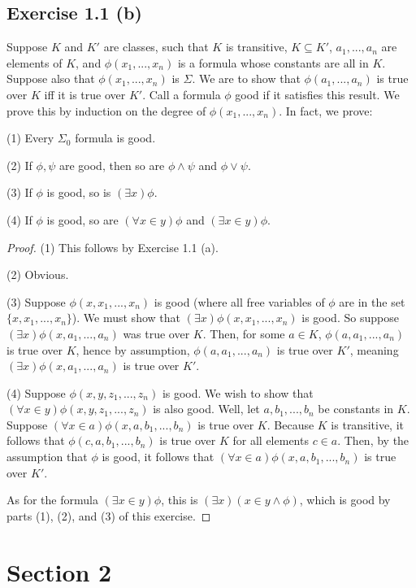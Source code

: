 \documentclass{article}
\theoremstyle{definition}
\begin{document}
\subsection*{Exercise 1.1 (b)} 
Suppose $K$ and $K'$ are classes, such that $K$ is transitive, $K\subseteq K'$, 
$a_1,...,a_n$ are elements of $K$, and $\phi(x_1,...,x_n)$ is a formula whose constants are all in
$K$. Suppose also that $\phi(x_1,...,x_n)$ is $\Sigma$. We are to show that $\phi(a_1,...,a_n)$ is 
true over $K$ iff it is true over $K'$. Call a formula $\phi$ good if it satisfies this result. 
We prove this by induction on the degree of 
$\phi(x_1,...,x_n)$. In fact, we prove:

(1) Every $\Sigma_0$ formula is good.

(2) If $\phi,\psi$ are good, then so are $\phi\wedge\psi$ and $\phi\vee\psi$.

(3) If $\phi$ is good, so is $(\exists x)\phi$.

(4) If $\phi$ is good, so are $(\forall x\in y)\phi$ and $(\exists x\in y)\phi$.

\begin{proof}
(1) This follows by Exercise 1.1 (a).

(2) Obvious.

(3) Suppose $\phi(x,x_1,...,x_n)$ is good (where all free variables of $\phi$ are in the set $\{x,x_1,...,x_n\}$). 
We must show that $(\exists x)\phi(x,x_1,...,x_n)$ is good. So suppose $(\exists x)\phi(x,a_1,...,a_n)$ was true over 
$K$. Then, for some $a\in K$, $\phi(a,a_1,...,a_n)$ is true over $K$, hence by assumption, $\phi(a,a_1,...,a_n)$ is true over 
$K'$, meaning $(\exists x)\phi(x,a_1,...,a_n)$ is true over $K'$.

(4) Suppose $\phi(x,y,z_1,...,z_n)$ is good. We wish to show that $(\forall x\in y)\phi(x,y,z_1,...,z_n)$ is also good. 
Well, let $a,b_1,...,b_n$ be constants in $K$. Suppose $(\forall x\in a)\phi(x,a,b_1,...,b_n)$ is true over $K$. Because $K$ is transitive, 
it follows that $\phi(c,a,b_1,...,b_n)$ is true over $K$ for all elements $c\in a$. Then, by the assumption that $\phi$ is good, 
it follows that $(\forall x\in a)\phi(x,a,b_1,...,b_n)$ is true over $K'$.

As for the formula $(\exists x\in y)\phi$, this is $(\exists x)(x\in y\wedge\phi)$, which is good by parts (1), (2), and (3) of this exercise.
\end{proof}

\section*{Section 2}
\end{document}
